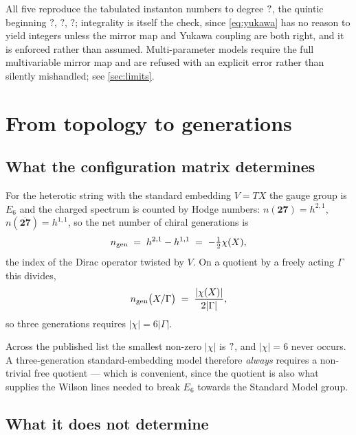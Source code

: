 \documentclass[11pt,a4paper]{article}
\newcommand{\FactGVQuinticOne}{?}\newcommand{\FactGVQuinticTwo}{?}
\newcommand{\FactGVQuinticThree}{?}
\theoremstyle{definition}
\begin{document}
All five reproduce the tabulated instanton numbers to degree
$?$, the quintic beginning $\FactGVQuinticOne$,
$\FactGVQuinticTwo$, $\FactGVQuinticThree$; integrality is itself the check, since \cref{eq:yukawa}
has no reason to yield integers unless the mirror map and Yukawa coupling are
both right, and it is enforced rather than assumed. Multi-parameter
models require the full multivariable mirror map and are refused with an
explicit error rather than silently mishandled; see \cref{sec:limits}.

\section{From topology to generations}
\label{sec:generations}

\subsection{What the configuration matrix determines}

For the heterotic string with the standard embedding $V = TX$ the gauge group
is $E_6$ and the charged spectrum is counted by Hodge numbers: $n(\mathbf{27})
= h^{2,1}$, $n(\overline{\mathbf{27}}) = h^{1,1}$, so the net number of chiral
generations is
%
\begin{equation}
n_{\rm gen} \;=\; h^{2,1} - h^{1,1} \;=\; -\tfrac{1}{2}\chi(X) ,
\label{eq:gen}
\end{equation}
%
the index of the Dirac operator twisted by $V$. On a quotient by a freely
acting $\Gamma$ this divides,
%
\begin{equation}
n_{\rm gen}\bigl(X/\Gamma\bigr) \;=\; \frac{|\chi(X)|}{2|\Gamma|} ,
\label{eq:genquot}
\end{equation}
%
so three generations requires $|\chi| = 6|\Gamma|$.

Across the published list the smallest non-zero $|\chi|$ is
$?$, and $|\chi| = 6$ never occurs. A three-generation
standard-embedding model therefore \emph{always} requires a non-trivial free
quotient --- which is convenient, since the quotient is also what supplies the
Wilson lines needed to break $E_6$ towards the Standard Model group.

\subsection{What it does not determine}
\label{sec:notdetermined}
\end{document}
